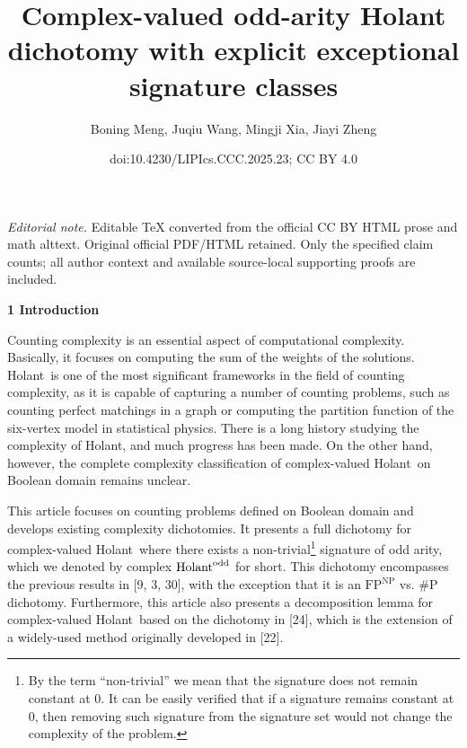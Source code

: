 \documentclass[10pt,a4paper]{article}
\title{Complex-valued odd-arity Holant dichotomy with explicit exceptional signature classes}
\author{Boning Meng, Juqiu Wang, Mingji Xia, Jiayi Zheng}
\date{doi:10.4230/LIPIcs.CCC.2025.23; CC BY 4.0}
\begin{document}
\maketitle
\noindent\textit{Editorial note.} Editable TeX converted from the official CC BY HTML prose and math alttext. Original official PDF/HTML retained. Only the specified claim counts; all author context and available source-local supporting proofs are included.\par\medskip


\par\medskip\noindent\textbf{
1 Introduction}\par




Counting complexity is an essential aspect of computational complexity. Basically, it focuses on computing the sum of the weights of the solutions.
Holant is one of the most significant frameworks in the field of counting complexity, as it is capable of capturing a number of counting problems, such as counting perfect matchings in a graph or computing the partition function of the six-vertex model in statistical physics. There is a long history studying the complexity of Holant, and much progress has been made. On the other hand, however, the complete complexity classification of complex-valued Holant on Boolean domain remains unclear.\par




This article focuses on counting problems defined on Boolean domain and develops existing complexity dichotomies. It presents a full dichotomy for complex-valued Holant where there exists a non-trivial\footnote{By the term “non-trivial” we mean that the signature does not remain constant at 0. It can be easily verified that if a signature remains constant at 0, then removing such signature from the signature set would not change the complexity of the problem.} signature of odd arity, which we denoted by complex $\textup{{Holant}}^{\text{odd}}$ for short. This dichotomy encompasses the previous results in [9, 3, 30], with the exception that it is an $\text{FP}^{\text{NP}}$ vs. \#P dichotomy. Furthermore, this article also presents a decomposition lemma for complex-valued Holant based on the dichotomy in [24], which is the extension of a widely-used method originally developed in [22].\par
\end{document}
